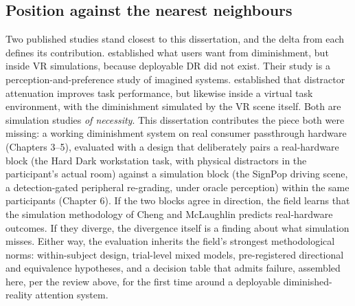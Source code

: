 \subsection{Position against the nearest neighbours}

Two published studies stand closest to this dissertation, and the delta from each defines its
contribution. \textbf{\citet{cheng2022}} established what users want from diminishment, but inside VR
simulations, because deployable DR did not exist. Their study is a perception-and-preference study
of imagined systems. \textbf{\citet{mclaughlin2025}} established that distractor attenuation improves
task performance, but likewise inside a virtual task environment, with the diminishment simulated
by the VR scene itself. Both are simulation studies \textit{of necessity}. This dissertation contributes
the piece both were missing: a working diminishment system on real consumer passthrough hardware
(Chapters 3–5), evaluated with a design that deliberately pairs a real-hardware block (the Hard Dark
workstation task, with physical distractors in the participant's actual room) against a
simulation block (the SignPop driving scene, a detection-gated peripheral re-grading, under oracle
perception) within the same participants
(Chapter 6). If the two blocks agree in direction, the field learns that the simulation methodology
of Cheng and McLaughlin predicts real-hardware outcomes. If they diverge, the divergence itself is a
finding about what simulation misses. Either way, the evaluation inherits the field's strongest
methodological norms: within-subject design, trial-level mixed models, pre-registered directional
and equivalence hypotheses, and a decision table that admits failure, assembled here, per the
review above, for the first time around a deployable diminished-reality attention system.
